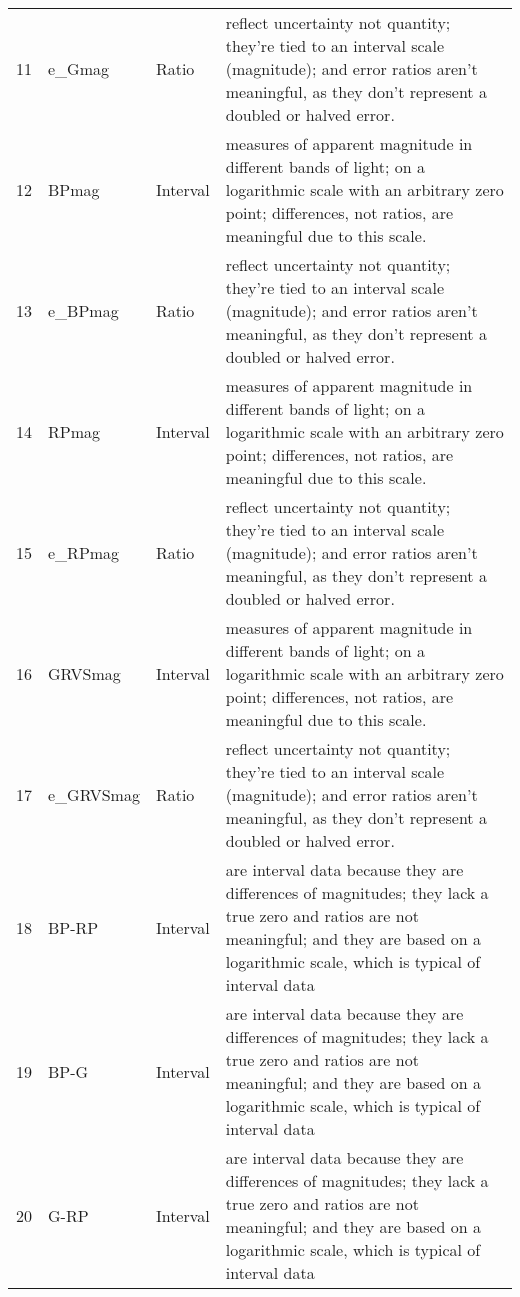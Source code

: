 \begin{table}[]
\begin{tabular}{llll}
11          & e\_Gmag              & Ratio                   & reflect uncertainty not quantity; they're tied to an interval scale (magnitude); and error ratios aren't meaningful, as they don't represent a doubled or halved error. \\
12          & BPmag                & Interval                   & measures of apparent magnitude in different bands of light; on a logarithmic scale with an arbitrary zero point; differences, not ratios, are meaningful due to this scale. \\
13          & e\_BPmag             & Ratio                   & reflect uncertainty not quantity; they're tied to an interval scale (magnitude); and error ratios aren't meaningful, as they don't represent a doubled or halved error. \\
14          & RPmag                & Interval                   & measures of apparent magnitude in different bands of light; on a logarithmic scale with an arbitrary zero point; differences, not ratios, are meaningful due to this scale. \\
15          & e\_RPmag             & Ratio                   &reflect uncertainty not quantity; they're tied to an interval scale (magnitude); and error ratios aren't meaningful, as they don't represent a doubled or halved error. \\
16          & GRVSmag              & Interval                   & measures of apparent magnitude in different bands of light; on a logarithmic scale with an arbitrary zero point; differences, not ratios, are meaningful due to this scale. \\
17          & e\_GRVSmag           & Ratio                   & reflect uncertainty not quantity; they're tied to an interval scale (magnitude); and error ratios aren't meaningful, as they don't represent a doubled or halved error. \\
18          & BP-RP                & Interval                & are interval data because they are differences of magnitudes; they lack a true zero and ratios are not meaningful; and they are based on a logarithmic scale, which is typical of interval data \\
19          & BP-G                 & Interval                &are interval data because they are differences of magnitudes; they lack a true zero and ratios are not meaningful; and they are based on a logarithmic scale, which is typical of interval data \\
20          & G-RP                 & Interval                & are interval data because they are differences of magnitudes; they lack a true zero and ratios are not meaningful; and they are based on a logarithmic scale, which is typical of interval data \\

\end{tabular}
\end{table}
